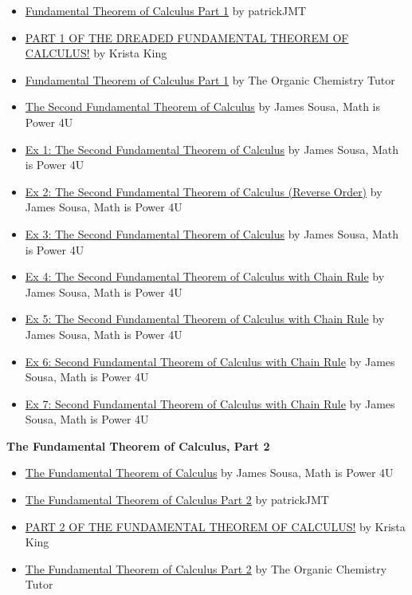 \begin{itemize}
    \item \href{https://youtu.be/PGmVvIglZx8}{Fundamental Theorem of Calculus Part 1} by patrickJMT
    \item \href{https://youtu.be/yrQ6PnE6D8w}{PART 1 OF THE DREADED FUNDAMENTAL THEOREM OF CALCULUS!} by Krista King
    \item \href{https://youtu.be/aeB5BWY0RlE}{Fundamental Theorem of Calculus Part 1} by The Organic Chemistry Tutor
    \item \href{https://youtu.be/jyRdHbHeUuU}{The Second Fundamental Theorem of Calculus} by James Sousa, Math is Power 4U
    \item \href{https://youtu.be/YE9jpfxEFYk}{Ex 1: The Second Fundamental Theorem of Calculus} by James Sousa, Math is Power 4U
    \item \href{https://youtu.be/gJtkTRjqM6I}{Ex 2: The Second Fundamental Theorem of Calculus (Reverse Order)} by James Sousa, Math is Power 4U
    \item \href{https://youtu.be/X5ke8bUiiQM}{Ex 3: The Second Fundamental Theorem of Calculus} by James Sousa, Math is Power 4U
    \item \href{https://youtu.be/ep52C-MUzDY}{Ex 4: The Second Fundamental Theorem of Calculus with Chain Rule} by James Sousa, Math is Power 4U
    \item \href{https://youtu.be/8IrK5JcjMvM}{Ex 5: The Second Fundamental Theorem of Calculus with Chain Rule} by James Sousa, Math is Power 4U
    \item \href{https://youtu.be/6p5NQwAeZRc}{Ex 6: Second Fundamental Theorem of Calculus with Chain Rule} by James Sousa, Math is Power 4U
    \item \href{https://youtu.be/18qhfQ2IeLU}{Ex 7: Second Fundamental Theorem of Calculus with Chain Rule} by James Sousa, Math is Power 4U
\end{itemize}

\textbf{The Fundamental Theorem of Calculus, Part 2}

\begin{itemize}
    \item \href{https://youtu.be/7AteFyUCyZo}{The Fundamental Theorem of Calculus} by James Sousa, Math is Power 4U
    \item \href{https://youtu.be/nHnZVFeQvNQ}{The Fundamental Theorem of Calculus Part 2} by patrickJMT
    \item \href{https://youtu.be/T-J7SkiE39Y}{PART 2 OF THE FUNDAMENTAL THEOREM OF CALCULUS!} by Krista King
    \item \href{https://youtu.be/ns8N1UuXl4w}{The Fundamental Theorem of Calculus Part 2} by The Organic Chemistry Tutor
\end{itemize}

